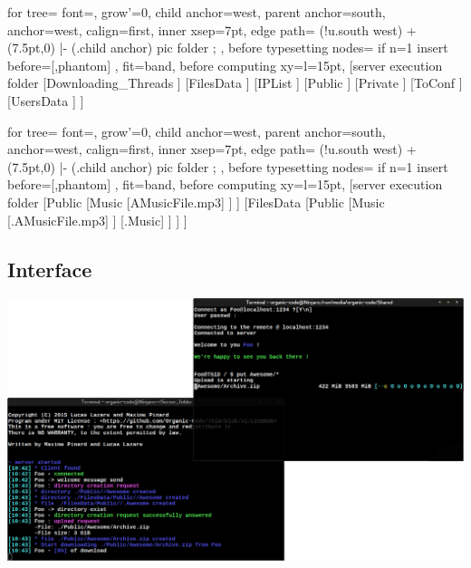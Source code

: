 \documentclass[11pt]{beamer}
\begin{document}
		\begin{frame}
			\begin{forest}
			  for tree={
			    font=\ttfamily,
			    grow'=0,
			    child anchor=west,
			    parent anchor=south,
			    anchor=west,
			    calign=first,
			    inner xsep=7pt,
			    edge path={
			      \noexpand{}
			      (!u.south west) +(7.5pt,0) |- (.child anchor) pic {folder} ;
			    },
			    before typesetting nodes={
			      if n=1
			        {insert before={[,phantom]}}
			        {}
			    },
			    fit=band,
			    before computing xy={l=15pt},
			  }  
			[server execution folder
			  [Downloading\_Threads
			  ]
			  [FilesData
			  ]
			  [IPList
			  ]
			  [Public
			  ]
			  [Private
			  ]
			  [ToConf
			  ]
			  [UsersData
			  ]
			]
			\end{forest}
		\end{frame}

		\begin{frame}
			\begin{forest}
			  for tree={
			    font=\ttfamily,
			    grow'=0,
			    child anchor=west,
			    parent anchor=south,
			    anchor=west,
			    calign=first,
			    inner xsep=7pt,
			    edge path={
			      \noexpand{}
			      (!u.south west) +(7.5pt,0) |- (.child anchor) pic {folder} \forestoption{edge label};
			    },
			    before typesetting nodes={
			      if n=1
			        {insert before={[,phantom]}}
			        {}
			    },
			    fit=band,
			    before computing xy={l=15pt},
			  }  
				[server execution folder
					[Public
						[Music
							[AMusicFile.mp3]
						]
					]
					[FilesData
						[Public
							[Music
								[.AMusicFile.mp3]
							]
							[.Music]
						]
					]
				]
			\end{forest}
		\end{frame}

	\subsection*{Interface}

		\begin{frame}
			\includegraphics[width=\linewidth]{interface}
		\end{frame}
\end{document}
